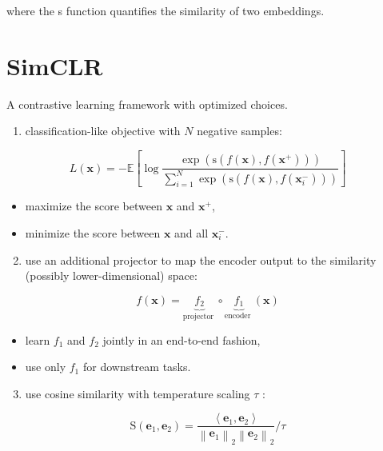 \documentclass[10pt]{article}
\begin{document}
where the s function quantifies the similarity of two embeddings.

\section*{SimCLR}
A contrastive learning framework with optimized choices.

\begin{enumerate}
  \item classification-like objective with $N$ negative samples:
\end{enumerate}

$$
L(\mathbf{x})=-\mathbb{E}\left[\log \frac{\exp \left(\mathrm{s}\left(f(\mathbf{x}), f\left(\mathbf{x}^{+}\right)\right)\right)}{\sum_{i=1}^{N} \exp \left(\mathrm{s}\left(f(\mathbf{x}), f\left(\mathbf{x}_{i}^{-}\right)\right)\right)}\right]
$$

\begin{itemize}
  \item maximize the score between $\mathbf{x}$ and $\mathbf{x}^{+}$,
  \item minimize the score between $\mathbf{x}$ and all $\mathbf{x}_{i}^{-}$.
\end{itemize}

\begin{enumerate}
  \setcounter{enumi}{1}
  \item use an additional projector to map the encoder output to the similarity (possibly lower-dimensional) space:
\end{enumerate}

$$
f(\mathbf{x})=\underbrace{f_{2}}_{\text {projector }} \circ \underbrace{f_{1}}_{\text {encoder }}(\mathbf{x})
$$

\begin{itemize}
  \item learn $f_{1}$ and $f_{2}$ jointly in an end-to-end fashion,
  \item use only $f_{1}$ for downstream tasks.
\end{itemize}

\begin{enumerate}
  \setcounter{enumi}{2}
  \item use cosine similarity with temperature scaling $\tau$ :
\end{enumerate}

$$
\mathrm{S}\left(\mathbf{e}_{1}, \mathbf{e}_{2}\right)=\frac{\left\langle\mathbf{e}_{1}, \mathbf{e}_{2}\right\rangle}{\left\|\mathbf{e}_{1}\right\|_{2}\left\|\mathbf{e}_{2}\right\|_{2}} / \tau
$$
\end{document}
